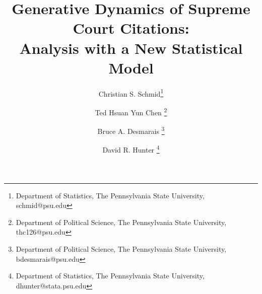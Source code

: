 \documentclass[headsepline=true, abstracton]{scrartcl}
\begin{document}
\renewcommand{\refname}{Bibliography}


\onehalfspacing
\setlength{\headsep}{15mm}


\thispagestyle{plain}

\title{\Large Generative Dynamics of Supreme Court Citations: \\ Analysis with a New Statistical Model}

\author{%
  Christian S. Schmid\footnote{Department of Statistics, The Pennsylvania State University, schmid@psu.edu}%
  \and Ted Hsuan Yun Chen \footnote{Department of Political Science, The Pennsylvania State University, thc126@psu.edu}%
   \and Bruce A. Desmarais \footnote{Department of Political Science, The Pennsylvania State University, bdesmarais@psu.edu}%
  \and David R. Hunter \footnote{Department of Statistics, The Pennsylvania State University, dhunter@stata.psu.edu}%
  }
\end{document}
